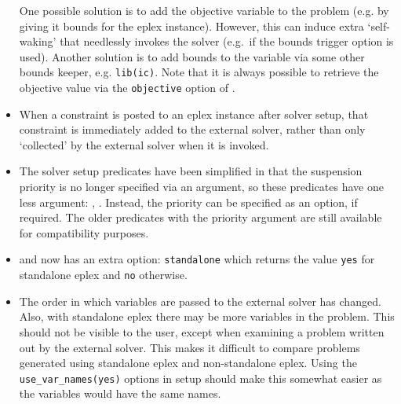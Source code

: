 \begin{sloppypar}
\begin{itemize}
One possible solution is to add the objective variable to the problem
(e.g. by giving it bounds for the eplex instance). However, this can induce
extra `self-waking' that needlessly invokes the solver (e.g.\ if the bounds
trigger option is used). Another solution is to add bounds to the variable
via some other bounds keeper, e.g. \verb'lib(ic)'. Note that it is always
possible to retrieve the objective value via the \verb'objective' option of
.

\item When a constraint is posted to an eplex instance after solver setup,
that constraint is immediately added to the external solver, rather than
only `collected' by the external solver when it is invoked. 

\item The solver setup predicates have been simplified in that the
suspension priority is no longer specified via an argument, so these
predicates have one less argument:
,
. Instead, the priority can be specified as an option, if
required. The older predicates with the priority argument are still
available for compatibility purposes.
\item {} and  now has an extra option:
\verb'standalone' which returns the value \verb'yes' for standalone eplex
and \verb'no' otherwise.

\item The order in which variables are passed to the external solver has
  changed. Also, with standalone eplex there may be more variables in the
  problem. This should not be visible to the user, except when examining a
  problem written out by the external solver. This makes it difficult to
  compare problems generated using standalone eplex and non-standalone
  eplex. Using the \verb'use_var_names(yes)' options in setup should make
  this somewhat easier as the variables would have the same names.

\end{itemize}
\end{sloppypar}
